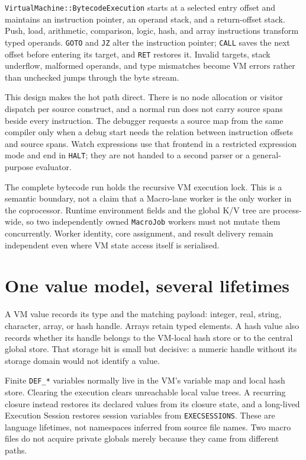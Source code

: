 \documentclass[a4paper,10pt,twoside,openany]{book}
\begin{document}
\texttt{VirtualMachine::BytecodeExecution} starts at a selected entry offset
and maintains an instruction pointer, an operand stack, and a return-offset
stack. Push, load, arithmetic, comparison, logic, hash, and array instructions
transform typed operands. \texttt{GOTO} and \texttt{JZ} alter the instruction
pointer; \texttt{CALL} saves the next offset before entering its target, and
\texttt{RET} restores it. Invalid targets, stack underflow, malformed operands,
and type mismatches become VM errors rather than unchecked jumps through the
byte stream.

This design makes the hot path direct. There is no node allocation or visitor
dispatch per source construct, and a normal run does not carry source spans
beside every instruction. The debugger requests a source map from the same
compiler only when a debug start needs the relation between instruction
offsets and source spans. Watch expressions use that frontend in a restricted
expression mode and end in \texttt{HALT}; they are not handed to a second
parser or a general-purpose evaluator.

The complete bytecode run holds the recursive VM execution lock. This is a
semantic boundary, not a claim that a Macro-lane worker is the only worker in
the coprocessor. Runtime environment fields and the global K/V tree are
process-wide, so two independently owned \texttt{MacroJob} workers must not
mutate them concurrently. Worker identity, core assignment, and result
delivery remain independent even where VM state access itself is serialised.

\section{One value model, several lifetimes}

A VM value records its type and the matching payload: integer, real, string,
character, array, or hash handle. Arrays retain typed elements. A hash value
also records whether its handle belongs to the VM-local hash store or to the
central global store. That storage bit is small but decisive: a numeric handle
without its storage domain would not identify a value.

Finite \texttt{DEF\_*} variables normally live in the VM's variable map and
local hash store. Clearing the execution clears unreachable local value trees.
A recurring closure instead restores its declared values from its closure
state, and a long-lived Execution Session restores session variables from
\texttt{EXECSESSIONS}. These are language lifetimes, not namespaces inferred
from source file names. Two macro files do not acquire private globals merely
because they came from different paths.
\end{document}
